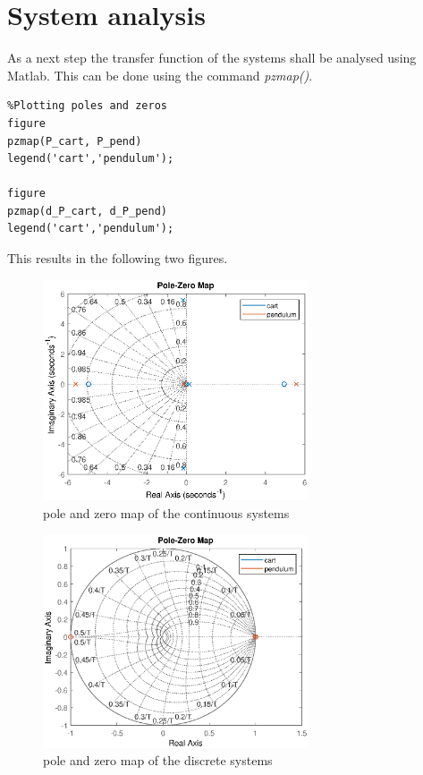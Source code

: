 \section{System analysis}
As a next step the transfer function of the systems shall be analysed using Matlab. This can be done using the command \textit{pzmap()}. 
\begin{lstlisting}
%Plotting poles and zeros 
figure
pzmap(P_cart, P_pend)
legend('cart','pendulum');

figure
pzmap(d_P_cart, d_P_pend)
legend('cart','pendulum');
\end{lstlisting}
This results in the following two figures.
\begin{figure}[H]
		\centering
		\includegraphics[width=0.7\textwidth]{figures/pzmap_cont.eps}
		\caption{pole and zero map of the continuous systems}
		\label{fig:pzmap_cont}
\end{figure}
\begin{figure}[H]
		\centering
		\includegraphics[width=0.7\textwidth]{figures/pzmap_disc.eps}
		\caption{pole and zero map of the discrete systems}
		\label{fig:pzmap_disc}
\end{figure}
